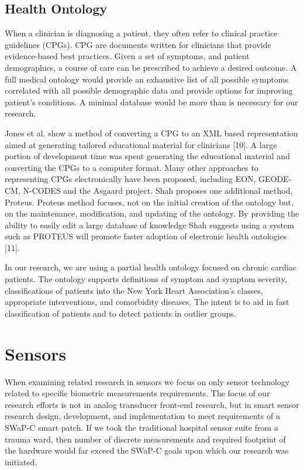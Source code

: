 \subsection{Health Ontology}
When a clinician is diagnosing a patient, they often refer to clinical practice guidelines (CPGs). CPG are documents written for clinicians that provide evidence-based best practices. Given a set of symptoms, and patient demographics, a course of care can be prescribed to achieve a desired outcome. A full medical ontology would provide an exhaustive list of all possible symptoms correlated with all possible demographic data and provide options for improving patient’s conditions. A minimal database would be more than is necessary for our research.

Jones et al. show a method of converting a CPG to an XML based representation aimed at generating tailored educational material for clinicians [10]. A large portion of development time was spent generating the educational material and converting the CPGs to a computer format.  Many other approaches to representing CPGs electronically have been proposed, including EON, GEODE-CM, N-CODES and the Asgaard project. Shah proposes one additional method, Proteus. Proteus method focuses, not on the initial creation of the ontology but, on the maintenance, modification, and updating of the ontology.  By providing the ability to easily edit a large database of knowledge Shah suggests using a system such as PROTEUS will promote faster adoption of electronic health ontologies [11].

In our research, we are using a partial health ontology focused on chronic cardiac patients. The ontology supports definitions of symptom and symptom severity, classifications of patients into the New York Heart Association’s classes, appropriate interventions, and comorbidity diseases. The intent is to aid in fast classification of patients and to detect patients in outlier groups.

\section{Sensors}
When examining related research in sensors we focus on only sensor technology related to specific biometric measurements requirements. The focus of our research efforts is not in analog transducer front-end research, but in smart sensor research design, development, and implementation to meet requirements of a SWaP-C smart patch. If we took the traditional hospital sensor suite from a trauma ward, then number of discrete measurements and required footprint of the hardware would far exceed the SWaP-C goals upon which our research was initiated.

